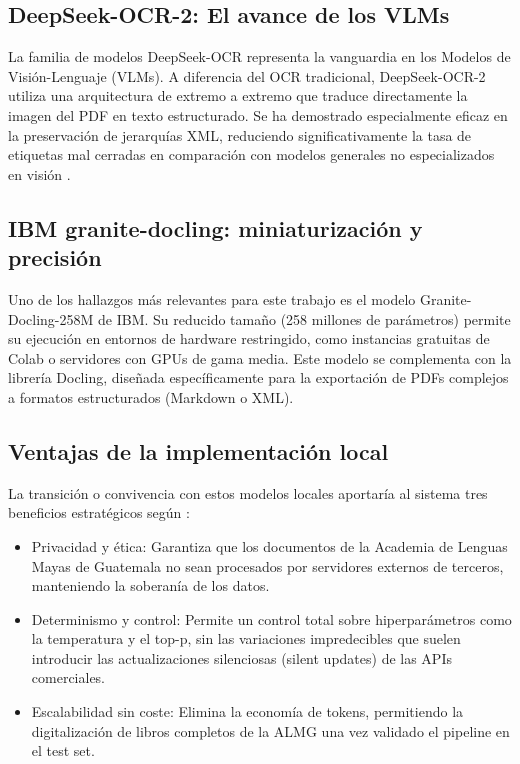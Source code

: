 \subsection{ DeepSeek-OCR-2: El avance de los VLMs }
La familia de modelos DeepSeek-OCR representa la vanguardia en los Modelos de Visión-Lenguaje (VLMs). A diferencia del OCR tradicional, DeepSeek-OCR-2 utiliza una arquitectura de extremo a extremo que traduce directamente la imagen del PDF en texto estructurado. Se ha demostrado especialmente eficaz en la preservación de jerarquías XML, reduciendo significativamente la tasa de etiquetas mal cerradas en comparación con modelos generales no especializados en visión \parencite{wei2026deepseekocr2visualcausal}.



\subsection{ IBM granite-docling: miniaturización y precisión }
Uno de los hallazgos más relevantes para este trabajo es el modelo Granite-Docling-258M de IBM. Su reducido tamaño (258 millones de parámetros) permite su ejecución en entornos de hardware restringido, como instancias gratuitas de Colab o servidores con GPUs de gama media. Este modelo se complementa con la librería Docling, diseñada específicamente para la exportación de PDFs complejos a formatos estructurados (Markdown o XML).

\subsection{ Ventajas de la implementación local }
La transición o convivencia con estos modelos locales aportaría al sistema tres beneficios estratégicos según
\textcite{xu2024ondevicelanguagemodelscomprehensive}:

\begin{itemize}
    \item Privacidad y ética: Garantiza que los documentos de la Academia de Lenguas Mayas de Guatemala no sean procesados por servidores externos de terceros, manteniendo la soberanía de los datos.
    \item Determinismo y control: Permite un control total sobre hiperparámetros como la temperatura y el top-p, sin las variaciones impredecibles que suelen introducir las actualizaciones silenciosas (silent updates) de las APIs comerciales.
    \item Escalabilidad sin coste: Elimina la economía de tokens, permitiendo la digitalización de libros completos de la ALMG una vez validado el pipeline en el test set.
\end{itemize}


